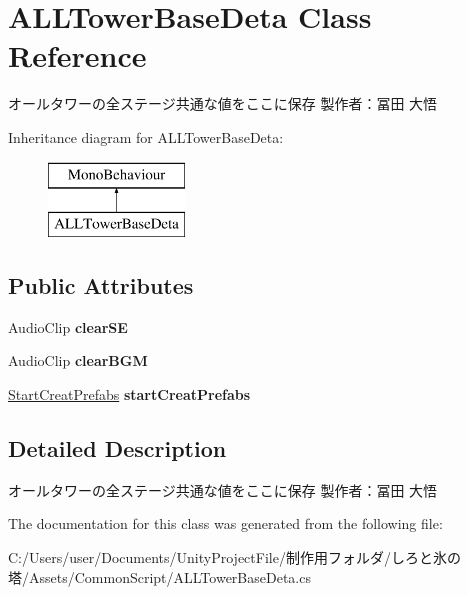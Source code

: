 \hypertarget{class_a_l_l_tower_base_deta}{}\section{A\+L\+L\+Tower\+Base\+Deta Class Reference}
\label{class_a_l_l_tower_base_deta}


オールタワーの全ステージ共通な値をここに保存 製作者：冨田 大悟  


Inheritance diagram for A\+L\+L\+Tower\+Base\+Deta\+:\begin{figure}[H]
\begin{center}
\leavevmode
\includegraphics[height=2.000000cm]{class_a_l_l_tower_base_deta}
\end{center}
\end{figure}
\subsection*{Public Attributes}
\begin{DoxyCompactItemize}
\item 
\mbox{\label{class_a_l_l_tower_base_deta_acf247d67627f56485303f17f33cfc8ee}} 
Audio\+Clip {\bfseries clear\+SE}
\item 
\mbox{\label{class_a_l_l_tower_base_deta_a6f8a15679f26c8c1453c35fe472ce194}} 
Audio\+Clip {\bfseries clear\+B\+GM}
\item 
\mbox{\label{class_a_l_l_tower_base_deta_a888fc3f68d86a125952346cd792ca5b2}} 
\hyperlink{class_start_creat_prefabs}{Start\+Creat\+Prefabs} {\bfseries start\+Creat\+Prefabs}
\end{DoxyCompactItemize}


\subsection{Detailed Description}
オールタワーの全ステージ共通な値をここに保存 製作者：冨田 大悟 



The documentation for this class was generated from the following file\+:\begin{DoxyCompactItemize}
\item 
C\+:/\+Users/user/\+Documents/\+Unity\+Project\+File/制作用フォルダ/しろと氷の塔/\+Assets/\+Common\+Script/A\+L\+L\+Tower\+Base\+Deta.\+cs\end{DoxyCompactItemize}
